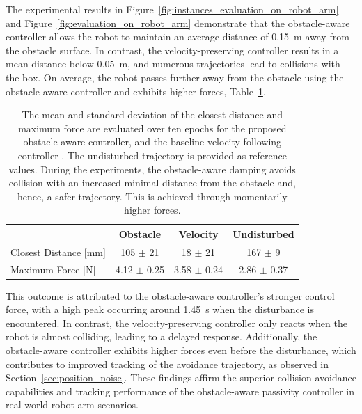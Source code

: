 The experimental results in \ifthesis Figure~\ref{fig:instances_evaluation_on_robot_arm} and \fi Figure~\ref{fig:evaluation_on_robot_arm} demonstrate that the obstacle-aware controller allows the robot to maintain an average distance of \qty{0.15}{m} away from the obstacle surface. In contrast, the velocity-preserving controller results in a mean distance below \qty{0.05}{m}, and numerous trajectories lead to collisions with the box. On average, the robot passes further away from the obstacle using the obstacle-aware controller and exhibits higher forces, Table~\ref{tab:evaluation_on_robot_arm}.

\begin{table}[htb]
    \centering
    \begin{tabular}{|l|c|c||c|} \hline
        & Obstacle & Velocity & Undisturbed \\ \hline
         Closest Distance [mm] &  {105 $\pm$ 21} & 18 $\pm$ 21 & 167 $\pm$ 9 \\ \hline
         Maximum Force [N] & {4.12 $\pm$ 0.25} & 3.58 $\pm$ 0.24 & 2.86 $\pm$ 0.37  \\ \hline 
    \end{tabular}
    \caption{The mean and standard deviation of the closest distance and maximum force are evaluated over ten epochs for the proposed obstacle aware controller, and the baseline velocity following controller \parencite{kronander2015passive}.
    The undisturbed trajectory is provided as reference values.
    During the experiments, the obstacle-aware damping avoids collision with an increased minimal distance from the obstacle and, hence, a safer trajectory. This is achieved through momentarily higher forces.}
    \label{tab:evaluation_on_robot_arm}
\end{table}

This outcome is attributed to the obstacle-aware controller's stronger control force, with a high peak occurring around \qty{1.45}{s} when the disturbance is encountered. In contrast, the velocity-preserving controller only reacts when the robot is almost colliding, leading to a delayed response. Additionally, the obstacle-aware controller exhibits higher forces even before the disturbance, which contributes to improved tracking of the avoidance trajectory, as observed in Section~\ref{sec:position_noise}. These findings affirm the superior collision avoidance capabilities and tracking performance of the obstacle-aware passivity controller in real-world robot arm scenarios.

